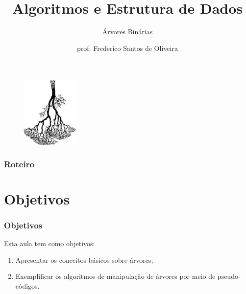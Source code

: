\documentclass[aspectratio=169]{beamer}
\title[Árvores Binárias]{Algoritmos e Estrutura de Dados}
\subtitle{Árvores Binárias}
\author[Frederico Santos de Oliveira]{prof. Frederico Santos de Oliveira}
\institute[UFMT]{Universidade Federal de Mato Grosso\\ Faculdade de Engenharia}
\date{}
\begin{document}
\begin{frame}
\titlepage %

\begin{figure}[!h]
  \centering
   \includegraphics[width=80pt]{imagens/introducao.png}
  \label{fig_introducao}
\end{figure}
\end{frame}


\begin{frame}
\frametitle{Roteiro} %
\tableofcontents %
\end{frame}


\section{Objetivos}

\begin{frame}
\frametitle{Objetivos}

Esta aula tem como objetivos:

\begin{enumerate}
\item Apresentar os conceitos básicos sobre árvores;
\item Exemplificar os algoritmos de manipulação de árvores por meio de pseudo-códigos.
\end{enumerate}

\end{frame}
\end{document}
